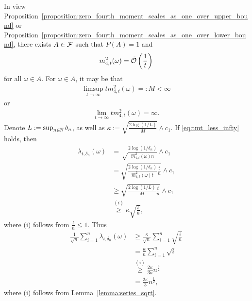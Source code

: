  In view Proposition~\ref{proposition:zero_fourth_moment_scales_as_one_over_upper_bound} or Proposition~\ref{proposition:zero_fourth_moment_scales_as_one_over_lower_bound}, there exists $A \in \mathcal{F}$ such that $P(A) = 1$ and %
    \begin{align} \label{eq:lemma17or18}
         m_{4, t}^2(\omega) = \tilde{\mathcal{O}} \left( \frac{1}{t}\right)
    \end{align}
    for all $\omega \in A$. For $\omega \in A$, it may be that
    \begin{align} \label{eq:tmt_less_infty}
        \limsup_{t \to \infty} t m_{4, t}^2(\omega) =: M < \infty
    \end{align}
    or 
    \begin{align} \label{eq:tmt_infty}
        \lim_{t \to \infty} t m_{4, t}^2(\omega) = \infty.
    \end{align}
    Denote $L:= \sup_{n\in\mathbb{N}} \delta_n$, as well as $\kappa:= \sqrt{\frac{2\log(1/L)}{M}} \wedge c_1$.  If \eqref{eq:tmt_less_infty} holds, then
    \begin{align*}
        \lambda_{t,\delta_n}(\omega) &= \sqrt\frac{2\log(1/\delta_n)}{\widehat m_{4, t}^2(\omega) n} \wedge c_1
        \\&= \sqrt{\frac{2\log(1/\delta_n)}{\widehat m_{4, t}^2(\omega) t} \frac{t}{n}} \wedge c_1
        \\&\geq \sqrt{\frac{2\log(1/L)}{M} \frac{t}{n}} \wedge c_1
        \\&\stackrel{(i)}{\geq} \kappa \sqrt{ \frac{t}{n}}, 
    \end{align*}
    where (i) follows from $\frac{t}{n} \leq 1$. Thus
    \begin{align*}
        \frac{1}{\sqrt{n}} \sum_{i = 1}^n \lambda_{i,\delta_n}(\omega) &\geq  \frac{\kappa}{\sqrt{n}}\sum_{i = 1}^n \sqrt{ \frac{i}{n}}
        \\&=  \frac{\kappa}{n}\sum_{i = 1}^n \sqrt{i}
        \\&\stackrel{(i)}{\geq}  \frac{2\kappa}{3n}n^{\frac{3}{2}}
        \\&\stackrel{}{=}  \frac{2\kappa}{3}n^{\frac{1}{2}},
    \end{align*}
    where (i) follows from Lemma~\ref{lemma:series_sqrt}.

